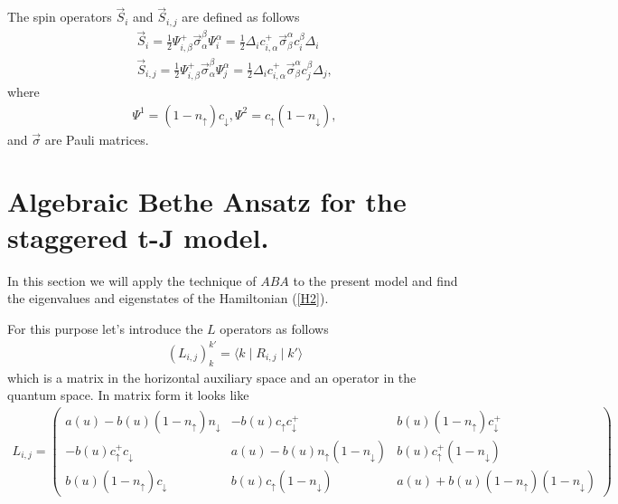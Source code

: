 \documentclass[a4paper,12pt]{article}
\newcommand{\half}{\frac{1}{2}}
\newcommand{\nn}{\nonumber}
\begin{document}
The spin operators $\vec{S}_{i}$ and $\vec{S}_{i,j}$ are defined as
follows 
\begin{eqnarray}
\label{SS}
\vec{S}_{i}={\half}\Psi_{i,\beta}^{+}\vec{\sigma}_{\alpha}^{\beta}
\Psi_{i}^{\alpha}={\half}\Delta_{i}c_{i,\alpha}^{+}\vec{\sigma}
_{\beta}^{\alpha}c_{i}^{\beta}\Delta_{i}\nn\\
\vec{S}_{i,j}={\half}\Psi_{i,\beta}^{+}\vec{\sigma}_{\alpha}^{\beta}
\Psi_{j}^{\alpha}={\half}\Delta_{i}c_{i,\alpha}^{+}\vec{\sigma}
_{\beta}^{\alpha}c_{j}^{\beta}\Delta_{j},
\end{eqnarray}
where
\begin{eqnarray}
\label{PSI}   
\Psi^{1}=(1-n_{\uparrow})c_{\downarrow},
\Psi^{2}=c_{\uparrow}(1-n_{\downarrow}),
\end{eqnarray}
and $\vec{\sigma}$ are Pauli matrices.


\section{Algebraic Bethe Ansatz for the staggered t-J model.}
\indent

In this section we will apply the technique of $ABA$ \cite{FT,BBO,EK}
to the present model and find the eigenvalues and eigenstates of the 
Hamiltonian (\ref{H2}).

For this purpose let's introduce the $L$ operators as follows
\begin{eqnarray}
\label{L1}
(L_{i,j})_{k}^{k'}=\langle{k}\mid{R}_{i,j}\mid{k'}\rangle
\end{eqnarray}
which is a matrix in the horizontal auxiliary space and an operator 
in the quantum space. In matrix form it looks like
\begin{eqnarray}
\label{L2}
L_{i,j}=\left(
\begin{array}{lll}
a(u)-b(u)(1-n_{\uparrow})n_{\downarrow}& -b(u)c_{\uparrow}
c_{\downarrow}^{+}& b(u)(1-n_{\uparrow})c_{\downarrow}^{+}\\
 -b(u)c_{\uparrow}^{+}c_{\downarrow}& a(u)-b(u)n_{\uparrow}
(1-n_{\downarrow})& b(u)c_{\uparrow}^{+}(1-n_{\downarrow})\\
b(u)(1-n_{\uparrow})c_{\downarrow}& b(u)c_{\uparrow}
(1-n_{\downarrow})
&a(u)+b(u)(1-n_{\uparrow})(1-n_{\downarrow})
\end{array}
\right) \nonumber\\
\end{eqnarray}
\end{document}
